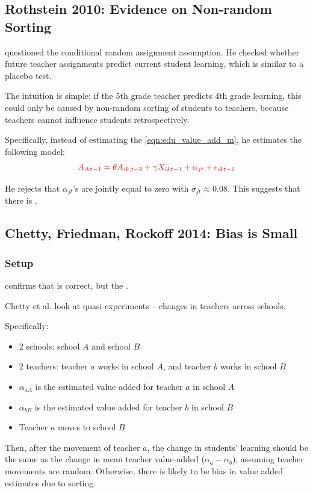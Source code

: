     \subsection{Rothstein 2010: Evidence on Non-random Sorting}
        \cite{rothstein_teacher_2010} questioned the conditional random assignment assumption. He checked whether future teacher assignments predict current student learning, which is similar to a placebo test.

        The intuition is simple: if the 5th grade teacher predicts 4th grade learning, this could only be caused by non-random sorting of students to teachers, because teachers cannot influence students retrospectively.

        Specifically, instead of estimating the \ref{eqn:edu_value_add_m}, he estimates the following model:
        \begin{equation*}
            \color{red}
                A_{ikt-1} = \theta A_{ik,t-2} + \gamma X_{ikt-1} + \alpha_{jt} + \epsilon_{ikt-1}
        \end{equation*}

        He rejects that $\alpha_{jt}$'s are jointly equal to zero with $\sigma_{jt} \approx 0.08$. This suggests that there is .
        
    \subsection{Chetty, Friedman, Rockoff 2014: Bias is Small}

        \subsubsection{Setup}
            \cite{chetty_measuring_2014-1} confirms that \cite{rothstein_teacher_2010} is correct, but the .
    
            Chetty et al. look at quasi-experiments -- changes in teachers across schools.
    
            Specifically:
            \begin{itemize}
                \item 2 schools: school $A$ and school $B$
                \item 2 teachers: teacher $a$ works in school $A$, and teacher $b$ works in school $B$
                \item $\alpha_{aA}$ is the estimated value added for teacher $a$ in school $A$
                \item $\alpha_{bB}$ is the estimated value added for teacher $b$ in school $B$
                \item Teacher $a$ moves to school $B$
            \end{itemize}
            Then, after the movement of teacher $a$, the change in students' learning should be the same as the change in mean teacher value-added ($\alpha _{a}-\alpha_{b}$), assuming teacher movements are random. Otherwise, there is likely to be bias in value added estimates due to sorting.

